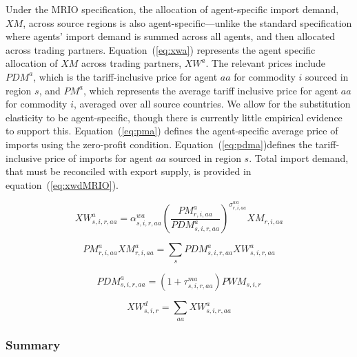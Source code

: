 \documentclass[11pt,letterpaper]{report}
\begin{document}
Under the MRIO specification, the allocation of agent-specific import demand,
$\mathit{XM}$, across source regions is also agent-specific---unlike the
standard specification where agents' import demand is summed across all agents,
and then allocated across trading partners. Equation~(\ref{eq:xwa}) represents
the agent specific allocation of $\mathit{XM}$ across trading partners,
$\mathit{XW^a}$. The relevant prices include $\mathit{PDM}^a$, which is the
tariff-inclusive price for agent $\mathit{aa}$ for commodity $i$ sourced in
region $s$, and $\mathit{PM}^a$, which represents the average tariff inclusive
price for agent $\mathit{aa}$ for commodity $i$, averaged over all source
countries. We allow for the substitution elasticity to be agent-specific, though
there is currently little empirical evidence to support this.
Equation~(\ref{eq:pma}) defines the agent-specific average price of imports
using the zero-profit condition. Equation~(\ref{eq:pdma})defines the
tariff-inclusive price of imports for agent $\mathit{aa}$ sourced in region $s$.
Total import demand, that must be reconciled with export supply, is provided in
equation~(\ref{eq:xwdMRIO}).

\begin{equation}
\label{eq:xwa}
\mathit{XW}^a_{s,i,r,\mathit{aa}} =
   \alpha^{\mathit{wa}}_{s,i,r,\mathit{aa}}
   \left( \frac {\mathit{PM}^a_{r,i,\mathit{aa}}}
      {\mathit{PDM}^a_{s,i,r,\mathit{aa}}}
   \right)^{\sigma^{\mathit{wa}}_{r,i,\mathit{aa}}}
   \mathit{XM}_{r,i,\mathit{aa}}
\end{equation}

\begin{equation}
\label{eq:pma}
\mathit{PM}^a_{r,i,\mathit{aa}} \mathit{XM}^a_{r,i,\mathit{aa}}
=  \sum_s{
      \mathit{PDM}^a_{s,i,r,\mathit{aa}} \mathit{XW}^a_{s,i,r,\mathit{aa}}
   }
\end{equation}

\begin{equation}
\label{eq:pdma}
\mathit{PDM}^a_{s,i,r,\mathit{aa}} =
   \left( 1 + \tau^\mathit{ma}_{s,i,r,\mathit{aa}} \right) \mathit{PWM}_{s,i,r}
\end{equation}

\begin{equation}
\label{eq:xwdMRIO}
\mathit{XW}^d_{s,i,r} = \sum_{\mathit{aa}} {\mathit{XW}^a_{s,i,r,\mathit{aa}}}
\end{equation}

\subsubsection{Summary}
\end{document}
